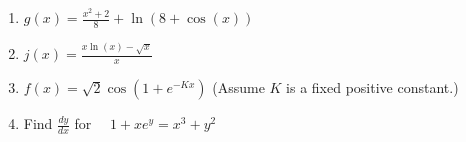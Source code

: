 \documentclass[12pt]{article}
\renewcommand{\emph}[1]{\textsf{\textbf{#1}}}
\newcounter{probcount}
\newcounter{subprobcount}
\newenvironment{subproblems}{%
\begin{enumerate}%
\setcounter{enumi}{\value{subprobcount}}%
\renewcommand{\theenumi}{\emph{\alph{enumi}}}}%
{\setcounter{subprobcount}{\value{enumi}}\end{enumerate}}
\newcommand{\ds}{\displaystyle}
\begin{document}
\begin{subproblems}
\item $\ds g(x)=\frac{x^2+2}{8}+ \ln(8+\cos(x))$\\
\vfill


\vfill 
\newpage
\item $\ds j(x)=\frac{x \ln(x) -\sqrt{x}}{x}$\\
\vfill

\item $\ds f(x)=\sqrt{2} \cos(1+e^{-Kx})$ (Assume $K$ is a fixed positive constant.)
\vfill

\item Find $\ds \frac{dy}{dx}$ for  $\quad \ds 1+xe^y= x^3+y^2$\\
\vfill

\end{subproblems}
\end{document}
